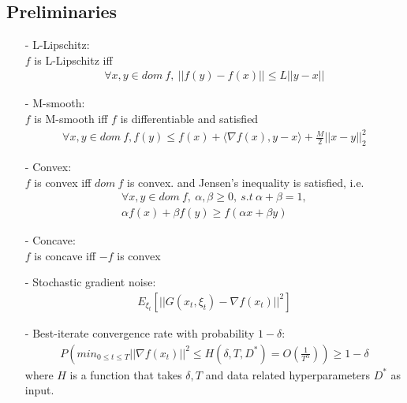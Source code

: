 \documentclass[14pt,onecolumn,letterpaper]{extarticle}
\begin{document}
\subsection{Preliminaries}
\begin{enumerate}
    \item [-] L-Lipschitz:\\
        
        \quad$f$ is L-Lipschitz iff 
        \begin{align*}
            \forall x, y \in dom\ f,\ ||f(y)-f(x)|| \leq L||y-x||
        \end{align*}

    \item [-] M-smooth:\\
    
        \quad$f$ is M-smooth iff $f$ is differentiable and satisfied \\
        \begin{align*}
            \forall x, y \in dom\ f, f(y) \leq f(x)+\langle\nabla f(x),y-x\rangle+\frac{M}{2}||x-y||_2^2
        \end{align*}
    \item [-] Convex:\\
    
    \quad$f$ is convex iff
        $dom\ f$ is convex.
        and Jensen's inequality is satisfied, i.e.
        \begin{align*}
            \forall x, y \in dom\ f,\ \alpha, \beta \geq 0,\ s.t\ \alpha + \beta = 1,\\
            \alpha f(x) + \beta f(y) \geq f(\alpha x + \beta y)
        \end{align*}
    \item [-] Concave:\\
    
    \quad$f$ is concave iff $-f$ is convex
    \item [-] Stochastic gradient noise:
    \begin{align*} 
        E_{\xi_t}[||G(x_t, \xi_t) - \nabla f(x_t)||^2] %
    \end{align*}
    \item [-] Best-iterate convergence rate with probability $1-\delta$: 
    \begin{align*} 
        P\left(min_{0\leq t \leq T} ||\nabla f(x_t)||^2 \leq H(\delta, T, D^*) = O\left(\frac{1}{T^\alpha}\right)\right) \geq 1 - \delta
    \end{align*}
    where $H$ is a function that takes $\delta, T$ and data related hyperparameters $D^*$ as input.
    
\end{enumerate}
\end{document}
